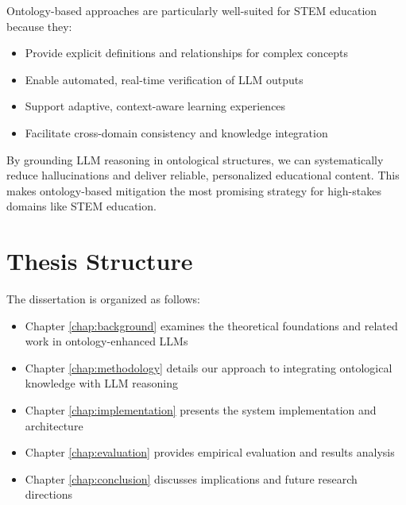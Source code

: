 
Ontology-based approaches are particularly well-suited for STEM education because they:
\begin{itemize}
    \item Provide explicit definitions and relationships for complex concepts
    \item Enable automated, real-time verification of LLM outputs
    \item Support adaptive, context-aware learning experiences
    \item Facilitate cross-domain consistency and knowledge integration
\end{itemize}

By grounding LLM reasoning in ontological structures, we can systematically reduce hallucinations and deliver reliable, personalized educational content. This makes ontology-based mitigation the most promising strategy for high-stakes domains like STEM education.


\section{Thesis Structure}

The dissertation is organized as follows:

\begin{itemize}
    \item Chapter \ref{chap:background} examines the theoretical foundations and related work in ontology-enhanced LLMs
    \item Chapter \ref{chap:methodology} details our approach to integrating ontological knowledge with LLM reasoning
    \item Chapter \ref{chap:implementation} presents the system implementation and architecture
    \item Chapter \ref{chap:evaluation} provides empirical evaluation and results analysis
    \item Chapter \ref{chap:conclusion} discusses implications and future research directions
\end{itemize} 